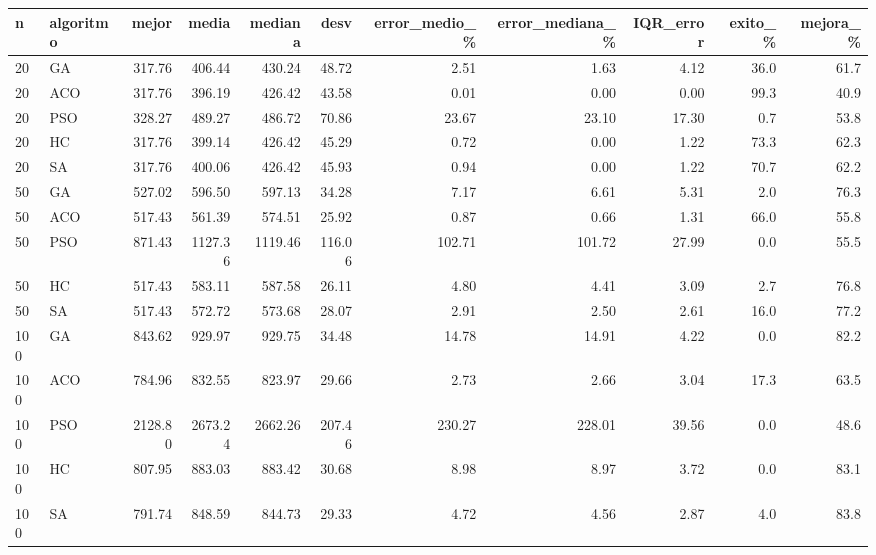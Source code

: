 \begin{tabular}{llrrrrrrrrr}
\toprule
n & algoritmo & mejor & media & mediana & desv & error\_medio\_\% & error\_mediana\_\% & IQR\_error & exito\_\% & mejora\_\% \\
\midrule
20 & GA & 317.76 & 406.44 & 430.24 & 48.72 & 2.51 & 1.63 & 4.12 & 36.0 & 61.7 \\
20 & ACO & 317.76 & 396.19 & 426.42 & 43.58 & 0.01 & 0.00 & 0.00 & 99.3 & 40.9 \\
20 & PSO & 328.27 & 489.27 & 486.72 & 70.86 & 23.67 & 23.10 & 17.30 & 0.7 & 53.8 \\
20 & HC & 317.76 & 399.14 & 426.42 & 45.29 & 0.72 & 0.00 & 1.22 & 73.3 & 62.3 \\
20 & SA & 317.76 & 400.06 & 426.42 & 45.93 & 0.94 & 0.00 & 1.22 & 70.7 & 62.2 \\
\midrule
50 & GA & 527.02 & 596.50 & 597.13 & 34.28 & 7.17 & 6.61 & 5.31 & 2.0 & 76.3 \\
50 & ACO & 517.43 & 561.39 & 574.51 & 25.92 & 0.87 & 0.66 & 1.31 & 66.0 & 55.8 \\
50 & PSO & 871.43 & 1127.36 & 1119.46 & 116.06 & 102.71 & 101.72 & 27.99 & 0.0 & 55.5 \\
50 & HC & 517.43 & 583.11 & 587.58 & 26.11 & 4.80 & 4.41 & 3.09 & 2.7 & 76.8 \\
50 & SA & 517.43 & 572.72 & 573.68 & 28.07 & 2.91 & 2.50 & 2.61 & 16.0 & 77.2 \\
\midrule
100 & GA & 843.62 & 929.97 & 929.75 & 34.48 & 14.78 & 14.91 & 4.22 & 0.0 & 82.2 \\
100 & ACO & 784.96 & 832.55 & 823.97 & 29.66 & 2.73 & 2.66 & 3.04 & 17.3 & 63.5 \\
100 & PSO & 2128.80 & 2673.24 & 2662.26 & 207.46 & 230.27 & 228.01 & 39.56 & 0.0 & 48.6 \\
100 & HC & 807.95 & 883.03 & 883.42 & 30.68 & 8.98 & 8.97 & 3.72 & 0.0 & 83.1 \\
100 & SA & 791.74 & 848.59 & 844.73 & 29.33 & 4.72 & 4.56 & 2.87 & 4.0 & 83.8 \\
\bottomrule
\end{tabular}
